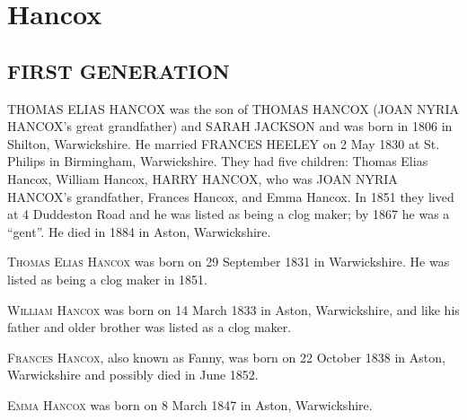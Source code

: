\section{Hancox}

\subsection{FIRST GENERATION}

\uppercase{Thomas Elias Hancox} was the son of \uppercase{Thomas Hancox} (\uppercase{Joan Nyria Hancox}'s great grandfather) and \uppercase{Sarah Jackson} and was born in 1806 in Shilton, Warwickshire.  He married \uppercase{Frances Heeley} on	2 May 1830 at St. Philips in	Birmingham, Warwickshire. They had five children: Thomas Elias Hancox, William Hancox, \uppercase{Harry Hancox}, who was \uppercase{Joan Nyria Hancox}'s grandfather, Frances Hancox, and Emma Hancox.  In 1851 they lived at 4 Duddeston Road and he was listed as being a clog maker; by 1867 he was a ``gent''. He died in 1884 in Aston, Warwickshire.

\textsc{Thomas Elias Hancox} was born on 29 September 1831 in	Warwickshire. He was listed as being a clog maker in 1851.

\textsc{William Hancox} was born on 14 March 1833 in Aston, Warwickshire, and like his father and older brother was listed as a clog maker.

\textsc{Frances Hancox}, also known as Fanny, was born on 22 October 1838 in Aston, Warwickshire and possibly died in June 1852.

\textsc{Emma Hancox} was born on	8 March 1847 in	Aston, Warwickshire.

